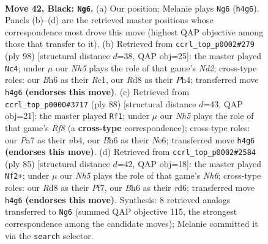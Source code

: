 \documentclass[11pt]{article}
\begin{document}
\clearpage

\begin{figure}[p]\centering
\begin{subfigure}{0.46\textwidth}\centering
\resizebox{\linewidth}{!}{%
\newchessgame
\chessboard[
  setfen={3r4/p3k3/Pp5b/1B3p2/4pP1n/8/5K2/1RB5 b - - 17 42},
  showmover=false,
  pgfstyle=straightmove, color=movearrow, markmove={h4-g6}
]}
\caption{}
\end{subfigure}\hfill
\begin{subfigure}{0.46\textwidth}\centering
\resizebox{\linewidth}{!}{%
\newchessgame
\chessboard[
  setfen={8/2r3bp/4k1p1/2p3P1/5P1P/5K2/3N4/2R5 w - - 6 50},
  showmover=false,
  pgfstyle=straightmove, color=movearrow, markmove={d2-c4}
]}
\caption{}
\end{subfigure}
\\[4pt]
\begin{subfigure}{0.46\textwidth}\centering
\resizebox{\linewidth}{!}{%
\newchessgame
\chessboard[
  setfen={5R2/pB5k/4N2p/6pP/1n4P1/7K/1r6/1b6 w - - 4 45},
  showmover=false,
  pgfstyle=straightmove, color=movearrow, markmove={f8-f1}
]}
\caption{}
\end{subfigure}\hfill
\begin{subfigure}{0.46\textwidth}\centering
\resizebox{\linewidth}{!}{%
\newchessgame
\chessboard[
  setfen={3B4/5pk1/p2R4/Pb2P1p1/6P1/5B1n/2r5/7K b - - 6 43},
  showmover=false,
  pgfstyle=straightmove, color=movearrow, markmove={h3-f2}
]}
\caption{}
\end{subfigure}
\caption{\textbf{Move 42, Black: \texttt{Ng6}.} (a) Our position; Melanie plays \texttt{Ng6} (\texttt{h4g6}). Panels (b)--(d) are the retrieved master positions whose correspondence most drove this move (highest QAP objective among those that transfer to it). (b) Retrieved from \texttt{ccrl\_top\_p0002\#279} (ply 98) [structural distance $d$=38, QAP obj=25]: the master played \texttt{Nc4}; under $\mu$ our \emph{Nh5} plays the role of that game's \emph{Nd2}; cross-type roles: our \emph{B}h6 as their \emph{R}c1, our \emph{R}d8 as their \emph{P}h4; transferred move \texttt{h4g6} \textbf{(endorses this move)}. (c) Retrieved from \texttt{ccrl\_top\_p0000\#3717} (ply 88) [structural distance $d$=43, QAP obj=21]: the master played \texttt{Rf1}; under $\mu$ our \emph{Nh5} plays the role of that game's \emph{Rf8} (a \textbf{cross-type} correspondence); cross-type roles: our \emph{P}a7 as their \emph{n}b4, our \emph{B}h6 as their \emph{N}e6; transferred move \texttt{h4g6} \textbf{(endorses this move)}. (d) Retrieved from \texttt{ccrl\_top\_p0002\#2584} (ply 85) [structural distance $d$=42, QAP obj=18]: the master played \texttt{Nf2+}; under $\mu$ our \emph{Nh5} plays the role of that game's \emph{Nh6}; cross-type roles: our \emph{R}d8 as their \emph{P}f7, our \emph{B}h6 as their \emph{r}d6; transferred move \texttt{h4g6} \textbf{(endorses this move)}. Synthesis: 8 retrieved analogs transferred to \texttt{Ng6} (summed QAP objective 115, the strongest correspondence among the candidate moves); Melanie committed it via the \texttt{search} selector.}
\label{fig:thought-m83}
\end{figure}
\end{document}
